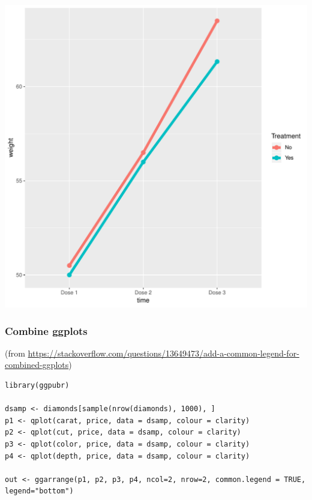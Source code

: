 \documentclass{article}
\begin{document}
\begin{center}
\includegraphics[width=.9\linewidth]{./figures/fig-meanTime5.pdf}
\end{center}

\subsubsection{Combine ggplots}
\label{sec:org4a99ac9}
(from \url{https://stackoverflow.com/questions/13649473/add-a-common-legend-for-combined-ggplots})

\lstset{language=r,label= ,caption= ,captionpos=b,numbers=none}
\begin{lstlisting}
library(ggpubr)

dsamp <- diamonds[sample(nrow(diamonds), 1000), ]
p1 <- qplot(carat, price, data = dsamp, colour = clarity)
p2 <- qplot(cut, price, data = dsamp, colour = clarity)
p3 <- qplot(color, price, data = dsamp, colour = clarity)
p4 <- qplot(depth, price, data = dsamp, colour = clarity) 

out <- ggarrange(p1, p2, p3, p4, ncol=2, nrow=2, common.legend = TRUE, legend="bottom")
\end{lstlisting}
\end{document}
